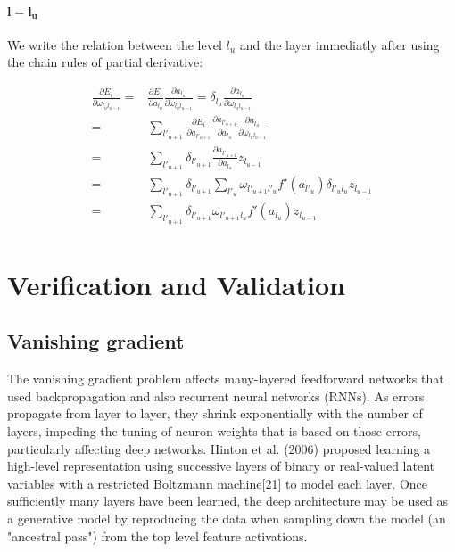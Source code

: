 \documentclass[final, paper=letter,5p,times,twocolumn]{elsarticle}
\begin{document}
\paragraph{$\bm{l = l_{u}}$}{We write the relation between the level $l_{u}$ and the layer immediatly after using the chain rules of partial derivative:

  \begin{equation*}
    \begin{split}
      \frac{\partial E_{i}}{\partial \omega_{l_{u}l_{u-1}}} = &  \frac{\partial E_{i}}{\partial a_{l_{u}}} \frac{\partial a_{l_{u}}}{\partial \omega_{l_{u}l_{u-1}}} = \delta_{l_{u}} \frac{\partial a_{l_{u}}}{\partial \omega_{l_{u}l_{u-1}}}  \\
              = & \sum_{l'_{u+1}}\frac{\partial E_{i}}{\partial a_{l'_{u+1}}} \frac{\partial a_{l'_{u+1}}}{\partial a_{l_{u}}} \frac{\partial a_{l_{u}}}{\partial \omega_{l_{u}l_{u-1}}}   \\
              = & \sum_{l'_{u+1}} \delta_{l'_{u+1}} \frac{\partial a_{l'_{u+1}}}{\partial a_{l_{u}}} z_{l_{u-1}}   \\
              = & \sum_{l'_{u+1}} \delta_{l'_{u+1}} \sum_{l'_{u}} \omega_{l'_{u+1}l'_{u}} f'(a_{l'_{u}}) \delta_{l'_{u}l_{u}} z_{l_{u-1}}   \\
              = & \sum_{l'_{u+1}} \delta_{l'_{u+1}} \omega_{l'_{u+1}l_{u}} f'(a_{l_{u}}) z_{l_{u-1}}   \\
    \end{split}
\end{equation*}

}


\section{Verification and Validation}
\lipsum[20-20]

\subsection{Vanishing gradient}

The vanishing gradient problem affects many-layered feedforward networks that used backpropagation and also recurrent neural networks (RNNs). As errors propagate from layer to layer, they shrink exponentially with the number of layers, impeding the tuning of neuron weights that is based on those errors, particularly affecting deep networks. Hinton et al. (2006) proposed learning a high-level representation using successive layers of binary or real-valued latent variables with a restricted Boltzmann machine[21] to model each layer. Once sufficiently many layers have been learned, the deep architecture may be used as a generative model by reproducing the data when sampling down the model (an "ancestral pass") from the top level feature activations.\\
\lipsum[19-19]
\end{document}
